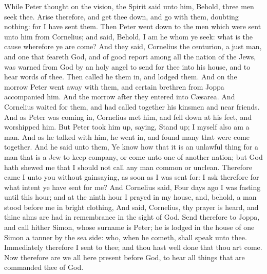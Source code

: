  While Peter thought on the vision, the Spirit said unto
him, Behold, three men seek thee.  Arise therefore, and
get thee down, and go with them, doubting nothing: for I have sent them.
 Then Peter went down to the men which were sent unto him
from Cornelius; and said, Behold, I am he whom ye seek: what is the
cause wherefore ye are come?  And they said, Cornelius
the centurion, a just man, and one that feareth God, and of good report
among all the nation of the Jews, was warned from God by an holy angel
to send for thee into his house, and to hear words of thee.
 Then called he them in, and lodged them. And on the
morrow Peter went away with them, and certain brethren from Joppa
accompanied him.  And the morrow after they entered into
Cæsarea. And Cornelius waited for them, and had called together his
kinsmen and near friends.  And as Peter was coming in,
Cornelius met him, and fell down at his feet, and worshipped him.
 But Peter took him up, saying, Stand up; I myself also
am a man.  And as he talked with him, he went in, and
found many that were come together.  And he said unto
them, Ye know how that it is an unlawful thing for a man that is a Jew
to keep company, or come unto one of another nation; but God hath shewed
me that I should not call any man common or unclean. 
Therefore came I unto you without gainsaying, as soon as I was sent for:
I ask therefore for what intent ye have sent for me?  And
Cornelius said, Four days ago I was fasting until this hour; and at the
ninth hour I prayed in my house, and, behold, a man stood before me in
bright clothing,  And said, Cornelius, thy prayer is
heard, and thine alms are had in remembrance in the sight of God.
 Send therefore to Joppa, and call hither Simon, whose
surname is Peter; he is lodged in the house of one Simon a tanner by the
sea side: who, when he cometh, shall speak unto thee. 
Immediately therefore I sent to thee; and thou hast well done that thou
art come. Now therefore are we all here present before God, to hear all
things that are commanded thee of God.

